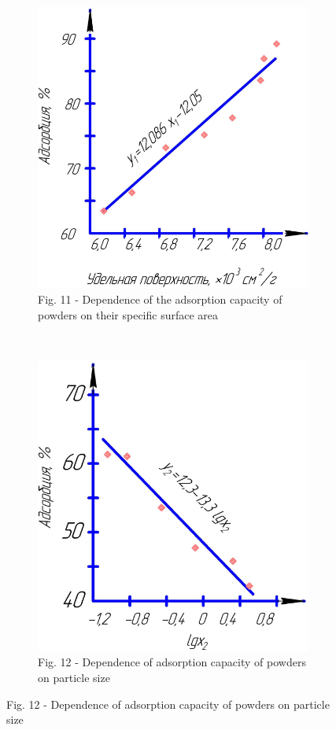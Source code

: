 \begin{figure}[H]
    \centering
    \begin{subfigure}{0.45\textwidth}
        \centering
        \includegraphics[width=\textwidth]{media/gorn2/image14}
        \caption*{Fig. 11 - Dependence of the adsorption capacity of powders on their specific surface area}
    \end{subfigure}
    ~
    \begin{subfigure}{0.45\textwidth}
        \centering
        \includegraphics[width=\textwidth]{media/gorn2/image15}
        \caption*{Fig. 12 - Dependence of adsorption capacity of powders on particle size}
    \end{subfigure}
\end{figure}

